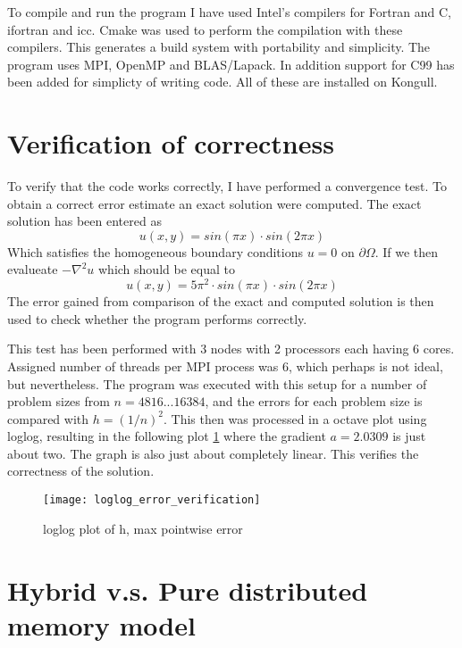 To compile and run the program I have used Intel's compilers for Fortran and C, ifortran and icc. Cmake was used to perform the compilation with these compilers. This generates a build system with portability and simplicity. 
The program uses MPI, OpenMP and BLAS/Lapack. In addition support for C99 has been added for simplicty of writing code.
All of these are installed on Kongull.


\section{Verification of correctness}
To verify that the code works correctly, I have performed a convergence test. To obtain a correct error estimate an exact solution were computed. The exact solution has been entered as 
\begin{equation}
	u(x,y) = sin(\pi x) \cdot sin(2\pi x)
\end{equation}
Which satisfies the homogeneous boundary conditions $u = 0 \text{ on } \partial\Omega$. If we then evalueate $-\nabla^2 u$ which should be equal to 
\begin{equation}
	u(x,y) = 5\pi^2 \cdot sin(\pi x) \cdot sin(2\pi x)
\end{equation}
The error gained from comparison of the exact and computed solution is then used to check whether the program performs correctly.

This test has been performed with 3 nodes with 2 processors each having 6 cores. Assigned number of threads per MPI process was 6, which perhaps is not ideal, but nevertheless. The program was executed with this setup for a number of problem sizes from $n=4 8 16 ...16384$, and the errors for each problem size is compared with $h=(1 / n)^2$. This then was processed in a octave plot using loglog, resulting in the following plot \ref{fig:loglogerror} where the gradient $a = 2.0309$ is just about two. The graph is also just about completely linear. This verifies the correctness of the solution. 
\begin{figure}[htbp]
	\centering
	\texttt{[image: loglog\_error\_verification]}
	\caption{loglog plot of h, max pointwise error}
	\label{fig:loglogerror}
\end{figure}

\section{Hybrid v.s. Pure distributed memory model}

